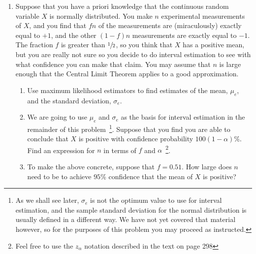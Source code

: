 \documentclass [12pt] {article}
\begin{document}
\begin{enumerate}

\item Suppose that you have a priori knowledge that the continuous random variable $X$ is normally distributed.  You make $n$ experimental measurements of $X$, and you find that $fn$ of the measurements are (miraculously) exactly equal to $+1$, and the other $(1-f)n$ measurements are exactly equal to $-1$.  The fraction $f$ is greater than $\sfrac{1}{2}$, so you think that $X$ has a positive mean, but you are really not sure so you decide to do interval estimation to see with what confidence you can make that claim.  You may assume that $n$ is large enough that the Central Limit Theorem applies to a good approximation.
	\begin{enumerate}
	\item Use maximum likelihood estimators to find estimates of the mean, $\mu_e$, and the standard deviation, $\sigma_e$.
	\item We are going to use $\mu_e$ and $\sigma_e$ as the basis for interval estimation in the remainder of this problem~\footnote{As we shall see later, $\sigma_e$ is not the optimum value to use for interval estimation, and the sample standard deviation for the normal distribution is usually defined in a different way.  We have not yet covered that material however, so for the purposes of this problem you may proceed as instructed.}.  Suppose that you find you are able to conclude that $X$ is positive with confidence probability $100(1-\alpha)\%$.  Find an expression for $n$ in terms of $f$ and $\alpha$~\footnote{Feel free to use the $z_\alpha$ notation described in the text on page 298}.
	\item To make the above concrete, suppose that $f=0.51$.  How large does $n$ need to be to achieve $95\%$ confidence that the mean of $X$ is positive?
	\end{enumerate}


\end{enumerate}
\end{document}
